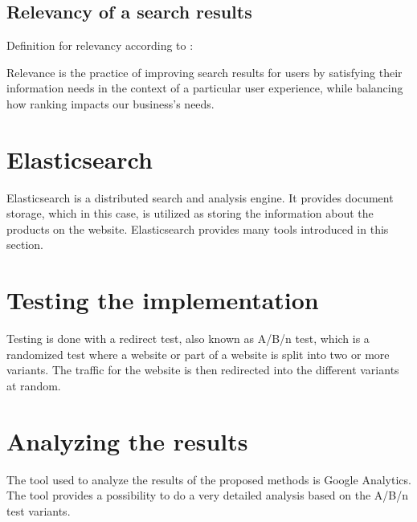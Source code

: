 \subsection{Relevancy of a search results}
\label{sec:relevancy}
Definition for relevancy according to \citeauthor{relevantSearch}: \cite{relevantSearch}

\begin{displayquote}
Relevance is the practice of improving search results for users by satisfying their information needs in the context of a particular user experience, 
while balancing how ranking impacts our business’s needs.
\end{displayquote}




\section{Elasticsearch}
Elasticsearch is a distributed search and analysis engine. 
It provides document storage, which in this case, is utilized as storing the information about the products on the website. 
Elasticsearch provides many tools introduced in this section. \cite{elasticIntro}




\section{Testing the implementation}
Testing is done with a redirect test, also known as A/B/n test, which is a randomized test where a website or part of a website is split into two or more variants. 
The traffic for the website is then redirected into the different variants at random. \cite{optimizeAbout}




\section{Analyzing the results}
\label{ch:analysis}
The tool used to analyze the results of the proposed methods is Google Analytics.  
The tool provides a possibility to do a very detailed analysis based on the A/B/n test variants. 
\cite{analyticsAbout}

